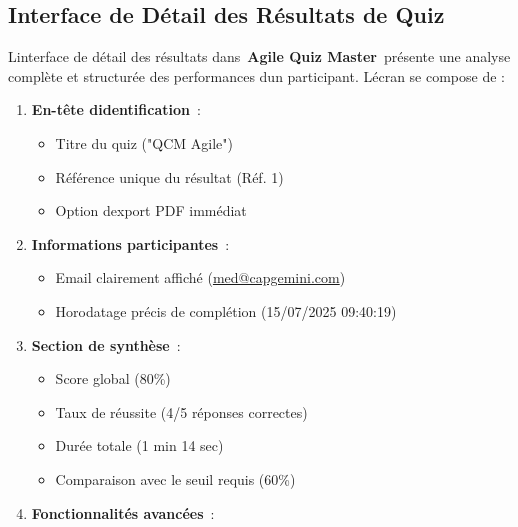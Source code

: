 \documentclass[12pt,a4paper,twoside,openright]{report}
\begin{document}
\hypertarget{interface-de-duxe9tail-des-ruxe9sultats-de-quiz}{%
\subsection{Interface de Détail des Résultats de
Quiz}\label{interface-de-duxe9tail-des-ruxe9sultats-de-quiz}}

L\textquotesingle interface de détail des résultats dans~\textbf{Agile
Quiz Master}~présente une analyse complète et structurée des
performances d\textquotesingle un participant. L\textquotesingle écran
se compose de :

\begin{enumerate}
\def\labelenumi{\arabic{enumi}.}
\item
  \textbf{En-tête d\textquotesingle identification}~:

  \begin{itemize}
  \item
    Titre du quiz ("QCM Agile")
  \item
    Référence unique du résultat (Réf. 1)
  \item
    Option d\textquotesingle export PDF immédiat
  \end{itemize}
\item
  \textbf{Informations participantes}~:

  \begin{itemize}
  \item
    Email clairement affiché
    (\href{https://mailto:med@copgermini.com/}{med@capgemini.com})
  \item
    Horodatage précis de complétion (15/07/2025 09:40:19)
  \end{itemize}
\item
  \textbf{Section de synthèse}~:

  \begin{itemize}
  \item
    Score global (80\%)
  \item
    Taux de réussite (4/5 réponses correctes)
  \item
    Durée totale (1 min 14 sec)
  \item
    Comparaison avec le seuil requis (60\%)
  \end{itemize}
\item
  \textbf{Fonctionnalités avancées}~:


\end{enumerate}
\end{document}
